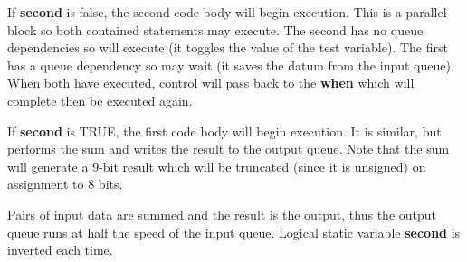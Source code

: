         If {\bf second} is false, the second code body will
        begin execution. This is a parallel block so both
        contained statements may execute. The second has no queue
        dependencies so will execute (it toggles the value of
        the test variable). The first has a queue
        dependency so may wait (it saves the datum from the
        input queue). When both have executed, control
        will pass back to the {\bf when} which will complete
        then be executed again.

        If {\bf second} is TRUE, the first code body will begin
        execution. It is similar, but performs the sum and
        writes the result to the output queue. Note that the sum will
        generate a 9-bit result which will be truncated (since it is
        unsigned) on assignment to 8 bits.

        Pairs of input data are summed and the result is the
        output, thus the output queue runs at half the speed of
        the input queue. Logical static variable {\bf second} is
        inverted each time.

